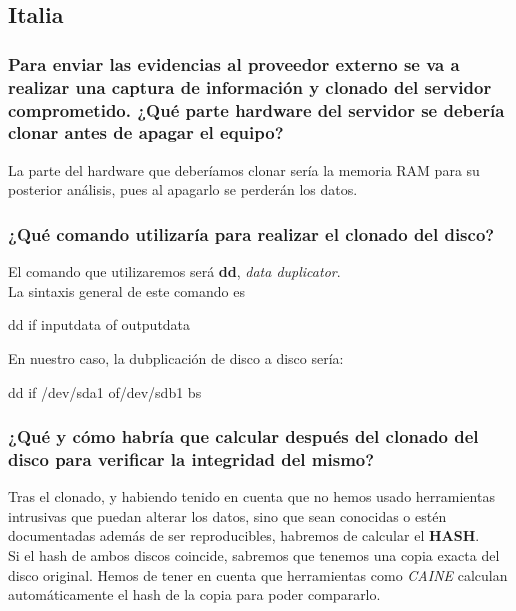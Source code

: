 \documentclass[12pt,twoside]{article}
\begin{document}
\subsection{Italia}

\subsubsection*{Para enviar las evidencias al proveedor externo se va a realizar una captura de información y clonado del servidor comprometido. 
¿Qué parte hardware del servidor se debería clonar antes de apagar el equipo?}
La parte del hardware que deberíamos clonar sería la memoria RAM para su posterior análisis, pues al apagarlo se perderán los datos.
\subsubsection*{¿Qué comando utilizaría para realizar el clonado del disco?}
El comando que utilizaremos será \textbf{dd}, \textit{data duplicator}. \\
La sintaxis general de este comando es 
\begin{center}
    dd if \textdblhyphen \textdollar input\textunderscore data of \textdblhyphen \textdollar output\textunderscore data
\end{center}
En nuestro caso, la dubplicación de disco a disco sería:
\begin{center}
    dd if \textdblhyphen /dev/sda1 of\textdblhyphen /dev/sdb1 bs
\end{center}


\subsubsection*{¿Qué y cómo habría que calcular después del clonado del disco para verificar la integridad del mismo?}
Tras el clonado, y habiendo tenido en cuenta que no hemos usado herramientas intrusivas que puedan alterar los datos, sino que sean conocidas o estén documentadas además de ser reproducibles, habremos de calcular el \textbf{HASH}. \\

Si el hash de ambos discos coincide, sabremos que tenemos una copia exacta del disco original. Hemos de tener en cuenta que herramientas como \textit{CAINE} calculan automáticamente el hash de la copia para poder compararlo. \\
\end{document}
